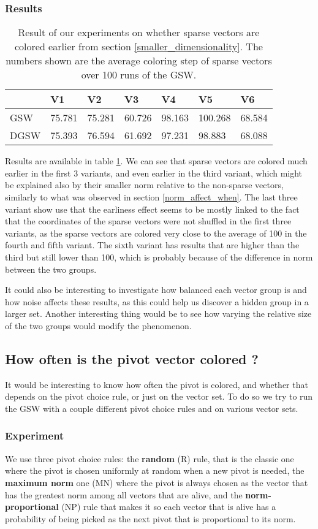 \documentclass[12pt]{article}
\begin{document}
\subsubsection{Results}
\begin{table}[h!]
\centering
\caption{Result of our experiments on whether sparse vectors are colored earlier from section \ref{smaller_dimensionality}. The numbers shown are the average coloring step of sparse vectors over 100 runs of the GSW.}
\begin{tabular}{l|llllll}
 &V1&V2&V3&V4&V5&V6\\
\hline
GSW&75.781&75.281&60.726&98.163&100.268&68.584\\
DGSW&75.393&76.594&61.692&97.231&98.883&68.088
\end{tabular}
\label{sparse_early_res}\end{table}
Results are available in table \ref{sparse_early_res}. We can see that sparse vectors are colored much earlier in the first 3 variants, and even earlier in the third variant, which might be explained also by their smaller norm relative to the non-sparse vectors, similarly to what was observed in section \ref{norm_affect_when}. The last three variant show use that the earliness effect seems to be mostly linked to the fact that the coordinates of the sparse vectors were not shuffled in the first three variants, as the sparse vectors are colored very close to the average of 100 in the fourth and fifth variant. The sixth variant has results that are higher than the third but still lower than 100, which is probably because of the difference in norm between the two groups.

It could also be interesting to investigate how balanced each vector group is and how noise affects these results, as this could help us discover a hidden group in a larger set. Another interesting thing would be to see how varying the relative size of the two groups would modify the phenomenon. 

\subsection{How often is the pivot vector colored ?}\label{pivot_colored}
It would be interesting to know how often the pivot is colored, and whether that depends on the pivot choice rule, or just on the vector set. To do so we try to run the GSW with a couple different pivot choice rules and on various vector sets.
\subsubsection{Experiment}
We use three pivot choice rules: the \textbf{random} (R) rule, that is the classic one where the pivot is chosen uniformly at random when a new pivot is needed, the \textbf{maximum norm} one (MN) where the pivot is always chosen as the vector that has the greatest norm among all vectors that are alive, and the \textbf{norm-proportional} (NP) rule that makes it so each vector that is alive has a probability of being picked as the next pivot that is proportional to its norm. 
\end{document}
